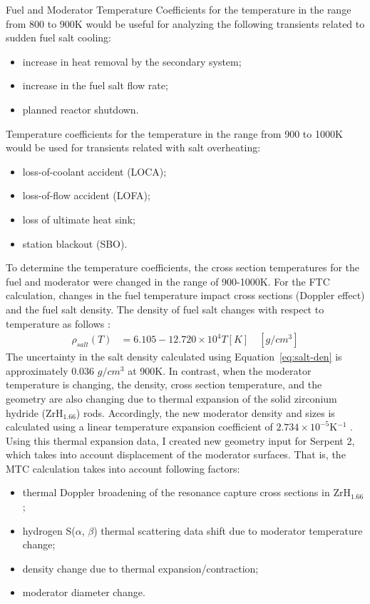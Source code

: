 Fuel and Moderator Temperature Coefficients for the temperature in the range 
from 800 to 900K would be useful for analyzing the following transients 
related to sudden fuel salt cooling: 
\begin{itemize}[noitemsep, topsep=0pt]
	\item increase in heat removal by the secondary system;
	\item increase in the fuel salt flow rate;
	\item planned reactor shutdown.
\end{itemize}
Temperature coefficients for the temperature in the range from 900 to 1000K 
would be used for transients related with salt overheating: 
\begin{itemize}[noitemsep, topsep=0pt]
	\item loss-of-coolant accident (LOCA);
	\item loss-of-flow accident (LOFA);
	\item loss of ultimate heat sink;
	\item  station blackout (SBO).
\end{itemize}

To determine the temperature coefficients, the cross section
temperatures for the fuel and moderator were changed in the range of 
900-1000K. For the FTC calculation, changes in the fuel temperature impact 
cross sections (Doppler effect) and the fuel salt density. The density of fuel 
salt changes with respect to temperature as follows 
\cite{janz_molten_1974}:
\begin{align}\label{eq:salt-den}
\rho_{salt}(T) &= 6.105 - 12.720\times10^4 T[K] \quad [g/cm^3]
\end{align}
The uncertainty in the salt density calculated using 
Equation~\ref{eq:salt-den} is approximately 0.036 $g/cm^3$ at 900K.
In contrast, when the moderator temperature is changing, the density, cross 
section temperature, and the geometry are also changing due to thermal 
expansion of the solid zirconium hydride (ZrH$_{1.66}$) rods. Accordingly, the 
new moderator density and sizes is calculated using a linear temperature 
expansion coefficient of $2.734\times10^{-5}$K$^{-1}$ 
\cite{yamanaka_thermal_1999}. Using this thermal expansion data, I created new 
geometry input for Serpent 2, which takes into account displacement of the 
moderator surfaces. That is, the MTC calculation takes into account following 
factors:
\begin{itemize}[noitemsep, topsep=0pt]
	\item thermal Doppler broadening of the resonance capture cross sections 
	in ZrH$_{1.66}$;
	\item hydrogen S($\alpha$, $\beta$) thermal scattering data shift due to 
	moderator temperature change;
	\item density change due to thermal expansion/contraction;
	\item moderator diameter change.
\end{itemize}
 
